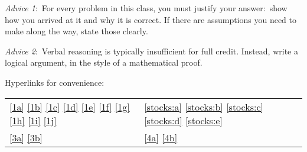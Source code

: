 \documentclass[12pt]{article}
\begin{document}
\renewcommand{\headrulewidth}{0.5pt}

\phantom{Test}

\begin{small}
\textit{Advice 1}:\ For every problem in this class, you must justify your answer:\ show how you arrived at it and why it is correct. If there are assumptions you need to make along the way, state those clearly.

\vspace{-3mm} 
\textit{Advice 2}:\ Verbal reasoning is typically insufficient for full credit. Instead, write a logical argument, in the style of a mathematical proof.
\vspace{-4mm} 
\end{small}

\hrulefill

Hyperlinks for convenience:
\begin{tabular}{ll}
\ref{1a}
\ref{1b}
\ref{1c}
\ref{1d}
\ref{1e}
\ref{1f}
\ref{1g}
\ref{1h}
\ref{1i}
\ref{1j}
&
\ref{stocks:a}
\ref{stocks:b}
\ref{stocks:c}
\ref{stocks:d}
\ref{stocks:e} \\
\ref{3a}
\ref{3b} &
\ref{4a}
\ref{4b} 
\end{tabular}
\end{document}

